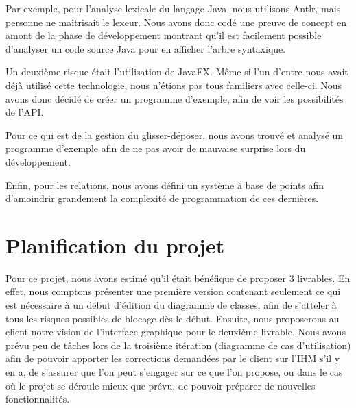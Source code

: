 \documentclass[hidelinks, 10pt,a4paper]{article}
\begin{document}
Par exemple, pour l'analyse lexicale du langage Java, nous utilisons Antlr, mais
personne ne maîtrisait le lexeur. Nous avons donc codé une preuve de concept en amont
de la phase de développement montrant qu'il est facilement possible d'analyser
un code source Java pour en afficher l'arbre syntaxique.

Un deuxième risque était l'utilisation de JavaFX. Même si l'un d'entre nous avait
déjà utilisé cette technologie, nous n'étions pas tous familiers avec celle-ci.
Nous avons donc décidé de créer un programme d'exemple, afin de voir les possibilités
de l'API.

Pour ce qui est de la gestion du glisser-déposer, nous avons trouvé et analysé
un programme d'exemple afin de ne pas avoir de mauvaise surprise lors du développement.

Enfin, pour les relations, nous avons défini un système à base de points afin d'amoindrir
grandement la complexité de programmation de ces dernières.

\newpage
\section{Planification du projet}
Pour ce projet, nous avons estimé qu'il était bénéfique de proposer 3 livrables.
En effet, nous comptons présenter une première version contenant seulement
ce qui est nécessaire à un début d'édition du diagramme de classes, afin de
s'atteler à tous les risques possibles de blocage dès le début. Ensuite, nous proposerons
au client notre vision de l'interface graphique pour le deuxième livrable. Nous avons prévu peu
de tâches lors de la troisième itération (diagramme de cas d'utilisation) afin de pouvoir
apporter les corrections demandées par le client sur l'IHM s'il y en a, de s'assurer que
l'on peut s'engager sur ce que l'on propose, ou dans le cas où le projet se déroule mieux
que prévu, de pouvoir préparer de nouvelles fonctionnalités.
\end{document}
